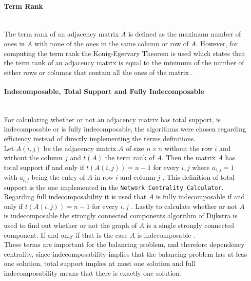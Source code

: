 \paragraph{Term Rank} \mbox{} \medskip \\
The term rank of an adjacency matrix $A$ is defined as the maximum number of ones in $A$ with none of the
ones in the same column or row of $A$. However, for computing the term rank the Konig-Egervary Theorem
is used which states that the term rank of an adjacency matrix is equal to the minimum of the number 
of either rows or columns that contain all the ones of the matrix \parencite{1978-Brualdi-Matrices}.

\paragraph{Indecomposable, Total Support and Fully Indecomposable} \mbox{} \medskip \\
For calculating whether or not an adjacency matrix has total support, is indecomposable or is
fully indecomposable, the algorithms were chosen regarding efficiency instead of directly implementing
the terms definitions.\\

Let $A(i,j)$ be the adjacency matrix $A$ of size $n\times n$ without the row $i$ and
without the column $j$ and $t(A)$
the term rank of $A$. Then the matrix $A$ has total support if and only if $t(A(i,j))=n-1$
for every $i,j$ where $a_{i,j}=1$ with $a_{i,j}$ being the entry of $A$ in row $i$ and 
column $j$ \parencite{1978-Brualdi-Matrices}. This definition of total support is the one implemented
in the \texttt{Network Centrality Calculator}.\\
Regarding full indecomposability it is used that $A$ is fully indecomposable if and only if $t(A(i,j))=n-1$ 
for every $i,j$ \parencite{1978-Brualdi-Matrices}.
Lastly to calculate whether or not $A$ is indecomposable the strongly connected components algorithm of
Dijkstra is used to find out whether or not the graph of $A$ is a single strongly connected component.
If and only if that is the case $A$ is indecomposable \parencite{1976-dijkstra-a}.\\

These terms are important for the balancing problem, and therefore dependency centrality, since indecomposability
implies that the balancing problem has at leas one solution, total support implies at most one solution and
full indecomposability means that there is exactly one solution.


